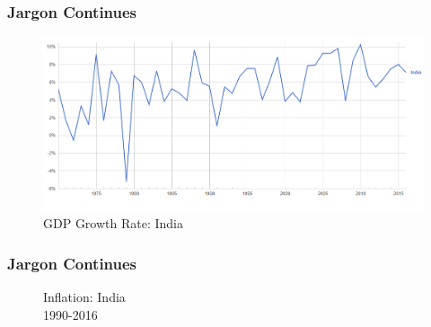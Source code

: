 \documentclass[shownotes,11pt, aspectratio=169]{beamer}
\begin{document}
\begin{frame}
\frametitle{Jargon Continues}
\begin{figure}[ht]
  \caption*{GDP Growth Rate: India}
    \includegraphics[width=.95\linewidth]{graphs/Growth_Rate_India.png} 
    \end{figure}
\end{frame}

\begin{frame}
\frametitle{Jargon Continues}
\begin{figure}[ht]
  \caption*{Inflation: India \\
           1990-2016}
    \end{figure}
\end{frame}
\end{document}
